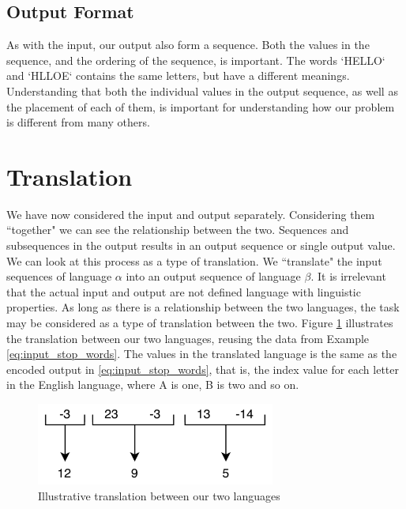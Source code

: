 \subsection{Output Format}
As with the input, our output also form a sequence. Both the values in the sequence, and the ordering of the sequence, is important. The words `HELLO` and `HLLOE` contains the same letters, but have a different meanings. Understanding that both the individual values in the output sequence, as well as the placement of each of them, is important for understanding how our problem is different from many others.


\section{Translation}
\label{sec:translation}
We have now considered the input and output separately. Considering them ``together" we can see the relationship between the two. Sequences and subsequences in the output results in an output sequence or single output value. We can look at this process as a type of translation. We ``translate" the input sequences of language \(\alpha\) into an output sequence of language \(\beta\). It is irrelevant that the actual input and output are not defined language with linguistic properties. As long as there is a relationship between the two languages, the task may be considered as a type of translation between the two. Figure \ref{fig:number_translation} illustrates the translation between our two languages, reusing the data from Example \ref{eq:input_stop_words}. The values in the translated language is the same as the encoded output in \ref{eq:input_stop_words}, that is, the index value for each letter in the English language, where A is one, B is two and so on.

\begin{figure}[ht]
    \centering
    \includegraphics[width=0.7\textwidth]{fig/background_theory/number_translation.png}
    \caption{Illustrative translation between our two languages}
    \label{fig:number_translation}
\end{figure}

